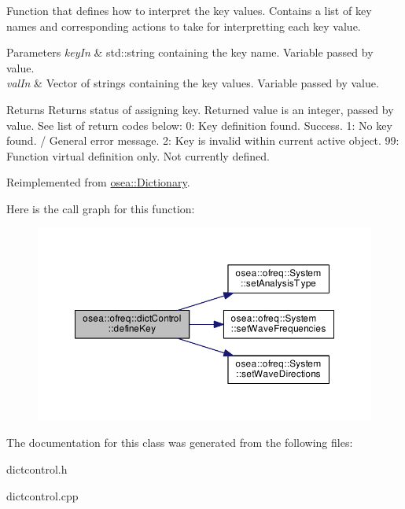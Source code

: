 Function that defines how to interpret the key values. Contains a list of key names and corresponding actions to take for interpretting each key value. 


\begin{DoxyParams}{Parameters}
{\em key\-In} & std\-::string containing the key name. Variable passed by value. \\
\hline
{\em val\-In} & Vector of strings containing the key values. Variable passed by value. \\
\hline
\end{DoxyParams}
\begin{DoxyReturn}{Returns}
Returns status of assigning key. Returned value is an integer, passed by value. See list of return codes below\-: 0\-: Key definition found. Success. 1\-: No key found. / General error message. 2\-: Key is invalid within current active object. 99\-: Function virtual definition only. Not currently defined. 
\end{DoxyReturn}


Reimplemented from \hyperlink{classosea_1_1_dictionary_ae96470181c8b1762204493fa45e96d7c}{osea\-::\-Dictionary}.



Here is the call graph for this function\-:
\nopagebreak
\begin{figure}[H]
\begin{center}
\leavevmode
\includegraphics[width=350pt]{classosea_1_1ofreq_1_1dict_control_a048421f7c1bc9b8a023a159c59407bb9_cgraph}
\end{center}
\end{figure}




The documentation for this class was generated from the following files\-:\begin{DoxyCompactItemize}
\item 
dictcontrol.\-h\item 
dictcontrol.\-cpp\end{DoxyCompactItemize}
